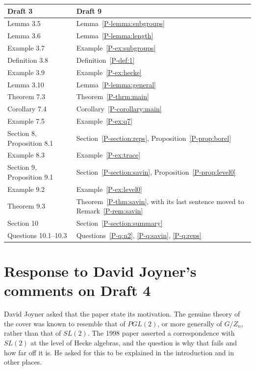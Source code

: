\documentclass[12pt,letterpaper]{amsart}
\begin{document}
\begin{longtable}{@{}p{}p{}@{}}
\toprule
{Draft 3} & Draft 9 \\
\midrule
\endhead
Lemma 3.5 & Lemma~\ref{P-lemma:subgroups} \\
Lemma 3.6 & Lemma~\ref{P-lemma:length} \\
Example 3.7 & Example~\ref{P-ex:subgroups} \\
Definition 3.8 & Definition~\ref{P-def:1} \\
Example 3.9 & Example~\ref{P-ex:hecke} \\
Lemma 3.10 & Lemma~\ref{P-lemma:general} \\
Theorem 7.3 & Theorem~\ref{P-thrm:main} \\
Corollary 7.4 & Corollary~\ref{P-corollary:main} \\
Example 7.5 & Example~\ref{P-ex:q7} \\
Section 8, Proposition 8.1 & Section~\ref{P-section:reps},
Proposition~\ref{P-prop:borel} \\
Example 8.3 & Example~\ref{P-ex:trace} \\
Section 9, Proposition 9.1 & Section~\ref{P-section:savin},
Proposition~\ref{P-prop:level0} \\
Example 9.2 & Example~\ref{P-ex:level0} \\
Theorem 9.3 & Theorem~\ref{P-thm:savin}, with its last sentence moved
to Remark~\ref{P-rem:savin} \\
Section 10 & Section~\ref{P-section:summary} \\
Questions 10.1--10.3 & Questions~\ref{P-q:n2}, \ref{P-q:savin},
\ref{P-q:reps} \\
\bottomrule
\end{longtable}

\section{Response to David Joyner's comments on Draft 4}

David Joyner asked that the paper state its motivation. The genuine
theory of the cover was known to resemble that of $PGL(2)$, or more
generally of $G/Z_n$, rather than that of $SL(2)$. The 1998 paper
asserted a correspondence with $SL(2)$ at the level of Hecke algebras,
and the question is why that fails and how far off it is. He asked for
this to be explained in the introduction and in other places.
\end{document}
